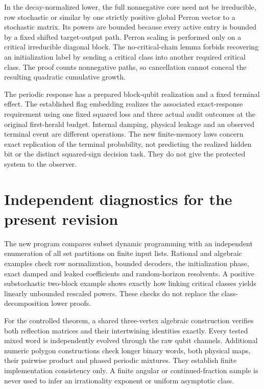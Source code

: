 In the decay-normalized lower, the full nonnegative core need not be irreducible, row stochastic or similar by one strictly positive global Perron vector to a stochastic matrix. Its powers are bounded because every active entry is bounded by a fixed shifted target-output path. Perron scaling is performed only on a critical irreducible diagonal block. The no-critical-chain lemma forbids recovering an initialization label by sending a critical class into another required critical class. The proof counts nonnegative paths, so cancellation cannot conceal the resulting quadratic cumulative growth.

The periodic response has a prepared block-qubit realization and a fixed terminal effect. The established flag embedding realizes the associated exact-response requirement using one fixed squared loss and three actual audit outcomes at the original first-herald budget. Internal damping, physical leakage and an observed terminal event are different operations. The new finite-memory laws concern exact replication of the terminal probability, not predicting the realized hidden bit or the distinct squared-sign decision task. They do not give the protected system to the observer.

\section{Independent diagnostics for the present revision}\label{sec:supp-r72-diagnostics}
The new program compares subset dynamic programming with an independent enumeration of all set partitions on finite input lists. Rational and algebraic examples check row normalization, bounded decoders, the initialization phase, exact damped and leaked coefficients and random-horizon resolvents. A positive substochastic two-block example shows exactly how linking critical classes yields linearly unbounded rescaled powers. These checks do not replace the class-decomposition lower proofs.

For the controlled theorem, a shared three-vertex algebraic construction verifies both reflection matrices and their intertwining identities exactly. Every tested mixed word is independently evolved through the raw qubit channels. Additional numeric polygon constructions check longer binary words, both physical maps, their pairwise product and phased periodic mixtures. They establish finite implementation consistency only. A finite angular or continued-fraction sample is never used to infer an irrationality exponent or uniform asymptotic class.
